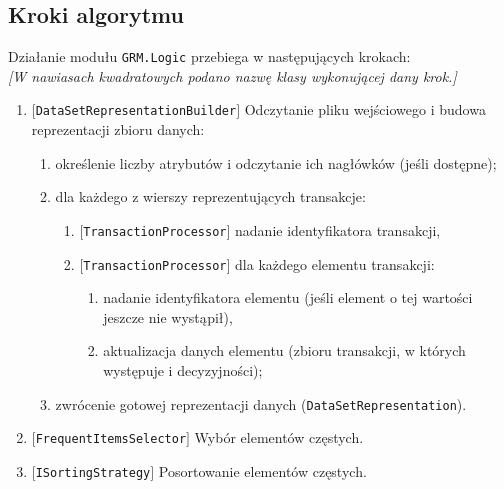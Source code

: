 \documentclass[a4paper,10pt]{article}
\begin{document}
 \subsection{Kroki algorytmu}
 Działanie modułu \verb+GRM.Logic+ przebiega w następujących krokach:\\
 \emph{[W nawiasach kwadratowych podano nazwę klasy wykonującej dany krok.]}
 
 \begin{enumerate}
  \item $[$\verb+DataSetRepresentationBuilder+$]$ Odczytanie pliku wejściowego i budowa reprezentacji zbioru danych:
   \begin{enumerate}
    \item określenie liczby atrybutów i odczytanie ich nagłówków (jeśli dostępne);
    \item dla każdego z wierszy reprezentujących transakcje:
     \begin{enumerate}
      \item $[$\verb+TransactionProcessor+$]$ nadanie identyfikatora transakcji,
      \item $[$\verb+TransactionProcessor+$]$ dla każdego elementu transakcji:
       \begin{enumerate}
        \item nadanie identyfikatora elementu (jeśli element o tej wartości jeszcze nie wystąpił),
        \item aktualizacja danych elementu (zbioru transakcji, w których występuje i decyzyjności);
       \end{enumerate}
     \end{enumerate}
    \item zwrócenie gotowej reprezentacji danych (\verb+DataSetRepresentation+).
   \end{enumerate}

  \item $[$\verb+FrequentItemsSelector+$]$ Wybór elementów częstych.
  
  \item $[$\verb+ISortingStrategy+$]$ Posortowanie elementów częstych.
  

\end{enumerate}
\end{document}
